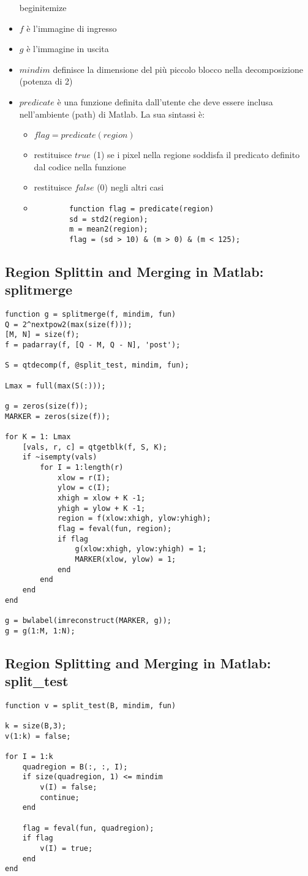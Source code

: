 \begin{itemize}
begin{itemize} 
\item $f$ è l'immagine di ingresso
\item $g$ è l'immagine in uscita
\item $mindim$ definisce la dimensione del più piccolo blocco nella decomposizione (potenza di 2)
\item $predicate$ è una funzione definita dall'utente che deve essere inclusa nell'ambiente (path) di Matlab. La sua sintassi è:
\begin{itemize}
	\item $flag = predicate(region)$
	\item restituisce $true$ (1) se i pixel nella regione soddisfa il predicato definito dal codice nella funzione
	\item restituisce $false$ (0) negli altri casi
	
	\item 
	\begin{lstlisting}
		function flag = predicate(region)
		sd = std2(region);
		m = mean2(region);
		flag = (sd > 10) & (m > 0) & (m < 125);
	\end{lstlisting}
\end{itemize}
\end{itemize}

\subsection{Region Splittin and Merging in Matlab: splitmerge}
\begin{lstlisting}
function g = splitmerge(f, mindim, fun)
Q = 2^nextpow2(max(size(f)));
[M, N] = size(f);
f = padarray(f, [Q - M, Q - N], 'post');

S = qtdecomp(f, @split_test, mindim, fun);

Lmax = full(max(S(:)));

g = zeros(size(f));
MARKER = zeros(size(f));

for K = 1: Lmax
	[vals, r, c] = qtgetblk(f, S, K);
	if ~isempty(vals)
		for I = 1:length(r)
			xlow = r(I);
			ylow = c(I);
			xhigh = xlow + K -1;
			yhigh = ylow + K -1;
			region = f(xlow:xhigh, ylow:yhigh);
			flag = feval(fun, region);
			if flag
				g(xlow:xhigh, ylow:yhigh) = 1;
				MARKER(xlow, ylow) = 1;
			end
		end
	end
end

g = bwlabel(imreconstruct(MARKER, g));
g = g(1:M, 1:N);
\end{lstlisting}

\subsection{Region Splitting and Merging in Matlab: split_test}
\begin{lstlisting}
function v = split_test(B, mindim, fun)

k = size(B,3);
v(1:k) = false;

for I = 1:k
	quadregion = B(:, :, I);
	if size(quadregion, 1) <= mindim
		v(I) = false;
		continue;
	end
	
	flag = feval(fun, quadregion);
	if flag
		v(I) = true;
	end
end
\end{lstlisting}
